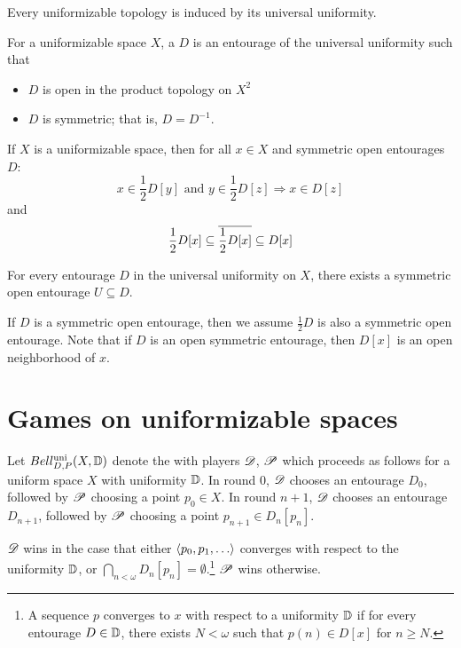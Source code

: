 \begin{thm}
  Every uniformizable topology is induced by its universal uniformity.
\end{thm}

\begin{defn}
  For a uniformizable space $X$, a  $D$ is an
  entourage of the universal uniformity such that
  \begin{itemize}
    \item $D$ is open in the product topology on $X^2$
    \item $D$ is symmetric; that is, $D=D^{-1}$.
  \end{itemize}
\end{defn}

\begin{prop}
  If $X$ is a uniformizable space, then for all $x\in X$ and symmetric open
  entourages $D$:
    \[
      x\in \frac{1}{2}D[y]\text{ and } y\in\frac{1}{2}D[z] \Rightarrow x\in D[z]
    \]
  and
    \[
      \frac{1}{2}D[x]\subseteq \overline{\frac{1}{2}D[x]}\subseteq D[x]
    \]
\end{prop}

\begin{thm}
  For every entourage $D$ in the universal uniformity on $X$, there exists a
  symmetric open entourage $U\subseteq D$.
\end{thm}

If $D$ is a symmetric open entourage, then we assume $\frac{1}{2}D$ is
also a symmetric open entourage. Note that if $D$ is an open symmetric
entourage, then $D[x]$ is an open neighborhood of $x$.



\section{Games on uniformizable spaces}

\begin{game}
  Let $Bell_{D,P}^{\textrm{uni}}(X, \mathbb{D})$ denote the  with
  players $\mathscr{D}$, $\mathscr{P}$ which
  proceeds as follows for a uniform space $X$ with uniformity $\mathbb{D}$. In round
  $0$, $\mathscr{D}$ chooses an entourage $D_0$, followed by $\mathscr{P}$ choosing a point
  $p_0\in X$. In round $n+1$, $\mathscr{D}$ chooses an entourage $D_{n+1}$, followed
  by $\mathscr{P}$ choosing a point $p_{n+1}\in D_n[p_n]$.

  $\mathscr{D}$ wins in the case that either $\<p_0,p_1,\dots\>$ converges
  with respect to the uniformity $\mathbb{D}$,
  or $\bigcap_{n<\omega}D_n[p_n] = \emptyset$.\footnote{
    A sequence $p$ converges to $x$ with respect to a uniformity $\mathbb{D}$
    if for every entourage $D\in\mathbb{D}$, there exists $N<\omega$ such that
    $p(n)\in D[x]$ for $n\geq N$.
  } $\mathscr{P}$ wins otherwise.
\end{game}

